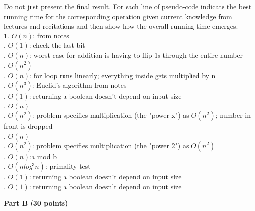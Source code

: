 \documentclass{article}
\begin{document}
\noindent Do not just present the final result. For each line of
pseudo-code indicate the best running time for the corresponding
operation given current knowledge from lectures and recitations and
then show how the overall running time emerges.\\

1. $O(n)$: from notes\\
. $O(1)$: check the last bit\\
. $O(n)$: worst case for addition is having to flip 1s through the entire number\\
. $O(n^2)$\\
. $O(n)$: for loop runs linearly; everything inside gets multiplied by n\\
. $O(n^3)$: Euclid's algorithm from notes\\
. $O(1)$: returning a boolean doesn't depend on input size\\
. $O(n)$\\
. $O(n^2)$: problem specifies multiplication (the "power x") as $O(n^2)$; number in front is dropped\\
. $O(n)$\\
. $O(n^2)$: problem specifies multiplication (the "power 2") as $O(n^2)$\\
. $O(n)$:a mod b\\
. $O(n log^3n)$: primality test\\
. $O(1)$: returning a boolean doesn't depend on input size\\
. $O(1)$: returning a boolean doesn't depend on input size\\

\begin{center}
{\bf Part B (30 points)}
\end{center}
\end{document}
